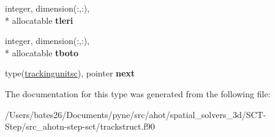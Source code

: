 \begin{DoxyCompactItemize}
\item 
\hypertarget{structtracking__data__structures_1_1trackingunitsc_af498c2cfd96a18df741805988a6d3ea5}{integer, dimension(\+:,\+:), \\*
allocatable {\bfseries tleri}}\label{structtracking__data__structures_1_1trackingunitsc_af498c2cfd96a18df741805988a6d3ea5}

\item 
\hypertarget{structtracking__data__structures_1_1trackingunitsc_a6b3cceaa9cf6b60ea0330fc48f3ab107}{integer, dimension(\+:,\+:), \\*
allocatable {\bfseries tboto}}\label{structtracking__data__structures_1_1trackingunitsc_a6b3cceaa9cf6b60ea0330fc48f3ab107}

\item 
\hypertarget{structtracking__data__structures_1_1trackingunitsc_ad91a2408f427440a9f4a543bc5923a92}{type(\hyperlink{structtracking__data__structures_1_1trackingunitsc}{trackingunitsc}), pointer {\bfseries next}}\label{structtracking__data__structures_1_1trackingunitsc_ad91a2408f427440a9f4a543bc5923a92}

\end{DoxyCompactItemize}


The documentation for this type was generated from the following file\+:\begin{DoxyCompactItemize}
\item 
/\+Users/bates26/\+Documents/pyne/src/ahot/spatial\+\_\+solvers\+\_\+3d/\+S\+C\+T-\/\+Step/src\+\_\+ahotn-\/step-\/sct/trackstruct.\+f90\end{DoxyCompactItemize}
